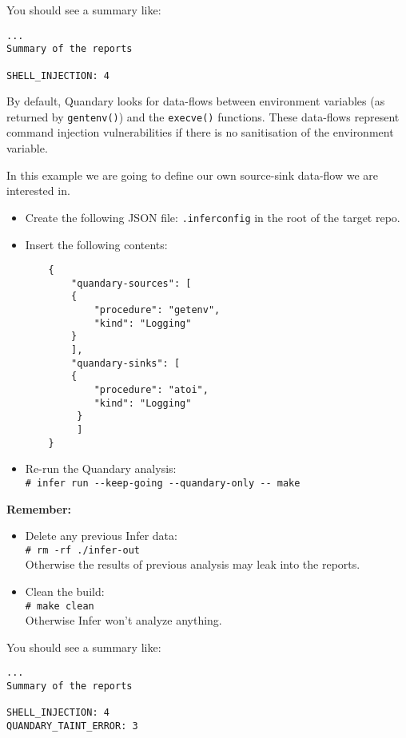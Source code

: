 You should see a summary like:

\begin{verbatim}
...
Summary of the reports

SHELL_INJECTION: 4
\end{verbatim}

By default, Quandary looks for data-flows between environment variables (as returned by \texttt{gentenv()})
and the \texttt{execve()} functions. These data-flows represent command injection vulnerabilities if there
is no sanitisation of the environment variable.


\vspace{0.5cm}
In this example we are going to define our own source-sink data-flow we are interested in.

\begin{itemize}
	\item Create the following JSON file: \texttt{.inferconfig} in the root of the target 
	repo.
	\item Insert the following contents:\\
	\noindent\begin{verbatim}
    {
        "quandary-sources": [
        {
            "procedure": "getenv",
            "kind": "Logging"
        }
        ],
        "quandary-sinks": [
        {
            "procedure": "atoi",
            "kind": "Logging"
         }
         ]
    }	
	\end{verbatim}
	\item Re-run the Quandary analysis:\\
	\verb|# infer run --keep-going --quandary-only -- make |
\end{itemize}

\textbf{Remember: }
\begin{itemize}
	\item Delete any previous Infer data:\\
	\verb|# rm -rf ./infer-out| \\
	Otherwise the results of previous analysis may leak into the reports.
	\item Clean the build:\\
	\verb|# make clean|\\
	Otherwise Infer won't analyze anything.
\end{itemize}

You should see a summary like:

\begin{verbatim}
...
Summary of the reports

SHELL_INJECTION: 4
QUANDARY_TAINT_ERROR: 3
\end{verbatim}

